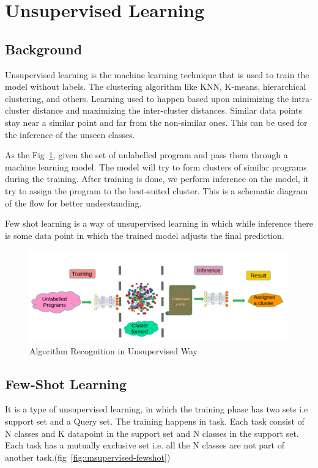 
\section{Unsupervised Learning}\label{sec:algo:unsup}
\subsection{Background}
Unsupervised learning is the machine learning technique that is used to train the model without labels. The clustering algorithm like KNN, K-means, hierarchical clustering, and others. 
	Learning used to happen based upon minimizing the intra-cluster distance and maximizing the inter-cluster distances. Similar data points stay near a similar point and far from the non-similar ones. This can be used for the inference of the unseen classes.
	
	As the Fig~\ref{fig:unsupervised-background}, given the set of unlabelled program and pass them through a  machine learning model. The model will try to form clusters of similar programs during the training. After training is done, we perform inference on the model, it try to assign the program to the best-suited cluster. This is a schematic diagram of the flow for better understanding.

	Few shot learning is a way of unsupervised learning in which while inference there is some data point in which the trained model adjusts the final prediction.

\begin{figure}[t]
    \centering
    \includegraphics[scale=0.4]{figures/chapter-3/unsupervised.png}
    \caption{Algorithm Recognition in Unsupervised Way}
     \label{fig:unsupervised-background}
\end{figure}

\subsection{Few-Shot Learning}
	    It is a type of unsupervised learning, in which the training phase has two sets i.e support set and a Query set. The training happens in task. Each task consist of N classes and K datapoint in the support set and N classes in the support set. Each task has a mutually exclusive set i.e. all the N classes are not part of another task.(fig~\ref{fig:unsupervised-fewshot})

